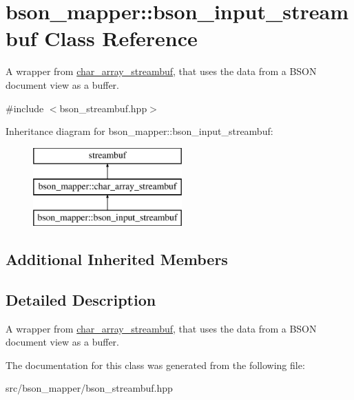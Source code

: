 \hypertarget{classbson__mapper_1_1bson__input__streambuf}{}\section{bson\+\_\+mapper\+:\+:bson\+\_\+input\+\_\+streambuf Class Reference}
\label{classbson__mapper_1_1bson__input__streambuf}


A wrapper from \hyperlink{classbson__mapper_1_1char__array__streambuf}{char\+\_\+array\+\_\+streambuf}, that uses the data from a B\+S\+ON document view as a buffer.  




{\ttfamily \#include $<$bson\+\_\+streambuf.\+hpp$>$}

Inheritance diagram for bson\+\_\+mapper\+:\+:bson\+\_\+input\+\_\+streambuf\+:\begin{figure}[H]
\begin{center}
\leavevmode
\includegraphics[height=3.000000cm]{classbson__mapper_1_1bson__input__streambuf}
\end{center}
\end{figure}
\subsection*{Additional Inherited Members}


\subsection{Detailed Description}
A wrapper from \hyperlink{classbson__mapper_1_1char__array__streambuf}{char\+\_\+array\+\_\+streambuf}, that uses the data from a B\+S\+ON document view as a buffer. 

The documentation for this class was generated from the following file\+:\begin{DoxyCompactItemize}
\item 
src/bson\+\_\+mapper/bson\+\_\+streambuf.\+hpp\end{DoxyCompactItemize}
